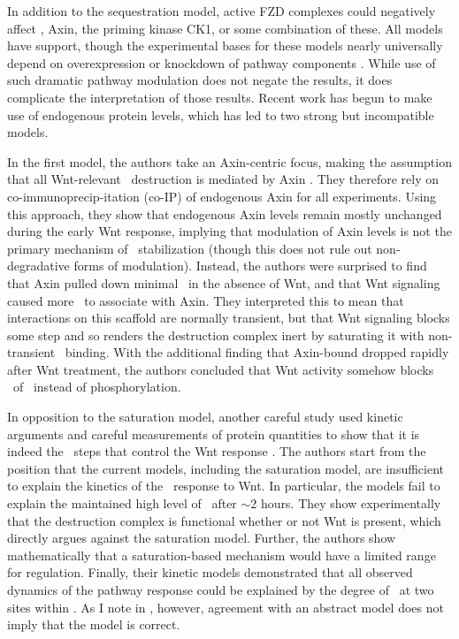 In addition to the sequestration model, active
FZD complexes could negatively affect \gsk, Axin, the priming kinase CK1\textalpha,
or some combination of these. All models have support, though
the experimental bases for these models nearly universally
depend on overexpression or knockdown of pathway components \cite{Hernandez2012,Li2012}. While use of such dramatic pathway modulation
does not negate the results, it does complicate the interpretation of those results. Recent work
has begun to make use of endogenous protein levels, which has led to two strong
but incompatible models.


In the first model, the authors take an Axin-centric focus,
making the assumption that all Wnt-relevant \bcat\ destruction is mediated by
Axin \cite{Li2012}. They therefore rely on
co-immunoprecip-itation (co-IP) of endogenous Axin
for all experiments. Using this approach, they show that endogenous Axin
levels remain mostly unchanged during the early Wnt response, implying that modulation
of Axin levels is not the primary mechanism of \bcat\ stabilization
(though this does not rule out
non-degradative forms of modulation).
Instead, the authors were surprised to find that Axin pulled down minimal
\bcat\ in the absence of Wnt, and that Wnt signaling caused more \bcat\
to associate with Axin. They interpreted this to mean that interactions
on this scaffold are normally transient, but that Wnt signaling blocks
some step and so renders the destruction complex inert by saturating it
with non-transient \bcat\ binding. 
With the additional finding that Axin-bound 
dropped rapidly after Wnt treatment, the authors concluded that Wnt
activity somehow blocks \ubn\ of \bcat\ instead of phosphorylation.


In opposition to the saturation model, another careful study
used kinetic arguments and careful measurements of protein
quantities to show that it is indeed the \pn\ steps that control the Wnt
response \cite{Hernandez2012}. The authors start from the position that
the current models, including the saturation model, are insufficient to
explain the kinetics of the \bcat\ response to Wnt. In particular, the
models fail to explain the maintained high level of \bcat\
after $\sim$2 hours.
They show experimentally that the destruction complex is functional
whether or not Wnt is present, which directly argues against the saturation
model. Further, the authors show mathematically that a saturation-based mechanism
would have a limited range for regulation. Finally, their kinetic models
demonstrated that all observed dynamics of the pathway response could be explained
by the degree of \pn\ at two sites within \bcat. As I note in
\ar{introduction:hierarchy}, however, agreement with an abstract model
does not imply that the model is correct.



